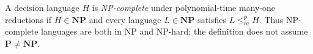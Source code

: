 
A decision language $H$ is \emph{NP-complete} under polynomial-time many-one reductions if $H\in\mathbf{NP}$ and every language $L\in\mathbf{NP}$ satisfies $L\le_m^p H$. Thus NP-complete languages are both in NP and NP-hard; the definition does not assume $\mathbf P\ne\mathbf{NP}$.
